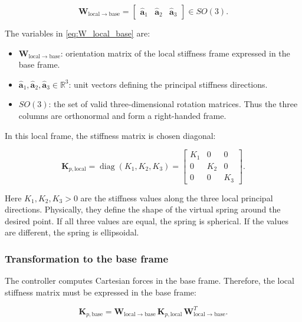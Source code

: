 \begin{equation}
\label{eq:W_local_base}
\mathbf{W}_{\mathrm{local}\rightarrow\mathrm{base}}
=
\begin{bmatrix}
\hat{\mathbf{a}}_1 & \hat{\mathbf{a}}_2 & \hat{\mathbf{a}}_3
\end{bmatrix}
\in SO(3).
\end{equation}

The variables in \cref{eq:W_local_base} are:
\begin{itemize}
  \item \(\mathbf{W}_{\mathrm{local}\rightarrow\mathrm{base}}\): orientation
        matrix of the local stiffness frame expressed in the base frame.
  \item \(\hat{\mathbf{a}}_1,\hat{\mathbf{a}}_2,\hat{\mathbf{a}}_3\in
        \mathbb{R}^3\): unit vectors defining the principal stiffness
        directions.
  \item \(SO(3)\): the set of valid three-dimensional rotation matrices.
        Thus the three columns are orthonormal and form a right-handed frame.
\end{itemize}

In this local frame, the stiffness matrix is chosen diagonal:

\begin{equation}
\label{eq:K_local}
\mathbf{K}_{p,\mathrm{local}}
=
\operatorname{diag}(K_1,K_2,K_3)
=
\begin{bmatrix}
K_1 & 0 & 0\\
0 & K_2 & 0\\
0 & 0 & K_3
\end{bmatrix}.
\end{equation}

Here \(K_1,K_2,K_3>0\) are the stiffness values along the three local
principal directions. Physically, they define the shape of the virtual
spring around the desired point. If all three values are equal, the
spring is spherical. If the values are different, the spring is
ellipsoidal.

\subsubsection*{Transformation to the base frame}

The controller computes Cartesian forces in the base frame. Therefore, the
local stiffness matrix must be expressed in the base frame:

\begin{equation}
\label{eq:K_base_local}
\mathbf{K}_{p,\mathrm{base}}
=
\mathbf{W}_{\mathrm{local}\rightarrow\mathrm{base}}\,
\mathbf{K}_{p,\mathrm{local}}\,
\mathbf{W}_{\mathrm{local}\rightarrow\mathrm{base}}^{T}.
\end{equation}

